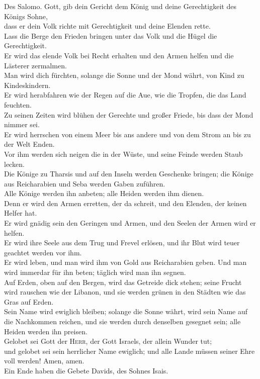  Des Salomo. Gott, gib dein Gericht dem König und deine
Gerechtigkeit des Königs Sohne,\\
 dass er dein Volk richte mit Gerechtigkeit und deine
Elenden rette.\\
 Lass die Berge den Frieden bringen unter das Volk und die
Hügel die Gerechtigkeit.\\
 Er wird das elende Volk bei Recht erhalten und den Armen
helfen und die Lästerer zermalmen.\\
 Man wird dich fürchten, solange die Sonne und der Mond
währt, von Kind zu Kindeskindern.\\
 Er wird herabfahren wie der Regen auf die Aue, wie die
Tropfen, die das Land feuchten.\\
 Zu seinen Zeiten wird blühen der Gerechte und großer
Friede, bis dass der Mond nimmer sei.\\
 Er wird herrschen von einem Meer bis ans andere und von
dem Strom an bis zu der Welt Enden.\\
 Vor ihm werden sich neigen die in der Wüste, und seine
Feinde werden Staub lecken.\\
 Die Könige zu Tharsis und auf den Inseln werden
Geschenke bringen; die Könige aus Reicharabien und Seba werden Gaben
zuführen.\\
 Alle Könige werden ihn anbeten; alle Heiden werden ihm
dienen.\\
 Denn er wird den Armen erretten, der da schreit, und den
Elenden, der keinen Helfer hat.\\
 Er wird gnädig sein den Geringen und Armen, und den
Seelen der Armen wird er helfen.\\
 Er wird ihre Seele aus dem Trug und Frevel erlösen, und
ihr Blut wird teuer geachtet werden vor ihm.\\
 Er wird leben, und man wird ihm von Gold aus
Reicharabien geben. Und man wird immerdar für ihn beten; täglich wird
man ihn segnen.\\
 Auf Erden, oben auf den Bergen, wird das Getreide dick
stehen; seine Frucht wird rauschen wie der Libanon, und sie werden
grünen in den Städten wie das Gras auf Erden.\\
 Sein Name wird ewiglich bleiben; solange die Sonne
währt, wird sein Name auf die Nachkommen reichen, und sie werden durch
denselben gesegnet sein; alle Heiden werden ihn preisen.\\
 Gelobet sei Gott der \textsc{Herr}, der Gott Israels,
der allein Wunder tut;\\
 und gelobet sei sein herrlicher Name ewiglich; und alle
Lande müssen seiner Ehre voll werden! Amen, amen.\\
 Ein Ende haben die Gebete Davids, des Sohnes Isais.

